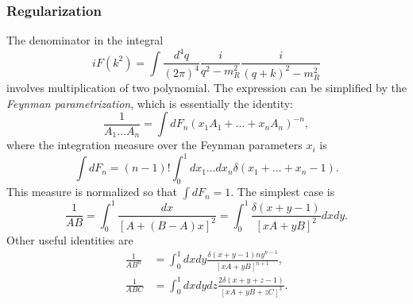 \subsubsection{Regularization}
The denominator in the integral
\begin{equation}
	iF(k^2) = \int \frac{d^4 q}{(2\pi)^4} \frac{i}{q^2-m_R^2} \frac{i}{(q+k)^2-m_R^2}
\end{equation}
involves multiplication of two polynomial.
The expression can be simplified by the \textit{Feynman parametrization}, which is essentially the identity:
\begin{equation}
	\frac{1}{A_{1} \ldots A_{n}}=\int d F_{n}\left(x_{1} A_{1}+\ldots+x_{n} A_{n}\right)^{-n},
\end{equation}
where the integration measure over the Feynman parameters $x_{i}$ is
\begin{equation}
	\int d F_{n}=(n-1) ! \int_{0}^{1} d x_{1} \ldots d x_{n} \delta\left(x_{1}+\ldots+x_{n}-1\right).
\end{equation}
This measure is normalized so that $\int d F_{n} =1$. 
The simplest case is
\begin{equation}
	\frac{1}{A B}=\int_{0}^{1} \frac{dx}{[A+(B-A) x]^{2}}
	=\int_{0}^{1} \frac{\delta(x+y-1)}{[x A+y B]^{2}} dx dy.
\end{equation}
Other useful identities are
\begin{equation}
\begin{aligned}
	\frac{1}{A B^{n}} &=\int_{0}^{1} dxdy\frac{\delta(x+y-1)n y^{n-1}}{[x A+y B]^{n+1}} , \\
	\frac{1}{A B C} &=\int_{0}^{1} dxdydz \frac{2\delta(x+y+z-1)}{[x A+y B+z C]^{3}} .
\end{aligned}
\end{equation}

